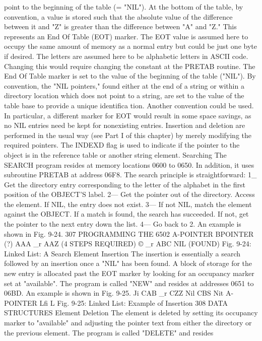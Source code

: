 \documentclass{book}
\begin{document}
{{{{{{{{{point to the beginning of the table (= "NIL"). At the bottom of the
table, by convention, a value is stored such that the absolute value
of the difference between it and "Z" is greater than the difference
between "A" and "Z." This represents an End Of Table (EOT)
marker. The EOT value is assumed here to occupy the same
amount of memory as a normal entry but could be just one byte if
desired.
The letters are assumed here to be alphabetic letters in ASCII
code. Changing this would require changing the constant at the
PRETAB routine.
The End Of Table marker is set to the value of the beginning of
the table ("NIL").
By convention, the "NIL pointers," found either at the end of a
string or within a directory location which does not point to a string,
are set to the value of the table base to provide a unique identifica
tion. Another convention could be used. In particular, a different
marker for EOT would result in some space savings, as no NIL
entries need be kept for nonexisting entries.
Insertion and deletion are performed in the usual way (see Part I
of this chapter) by merely modifying the required pointers. The
INDEXD flag is used to indicate if the pointer to the object is in
the reference table or another string element.
Searching
The SEARCH program resides at memory locations 0600 to
0650. In addition, it uses subroutine PRETAB at address 06F8.
The search principle is straightforward:
1_ Get the directory entry corresponding to the letter of the
alphabet in the first position of the OBJECT'S label.
2— Get the pointer out of the directory. Access the element. If NIL,
the entry does not exist.
3— If not NIL, match the element against the OBJECT. If a
match is found, the search has succeeded. If not, get the pointer to
the next entry down the list.
4— Go back to 2.
An example is shown in Fig. 9-24.
307
PROGRAMMING THE 6502
A-POINTER
BPOINTER
(?)
AAA _r AAZ
(4 STEPS REQUIRED)
©
_r ABC
NIL
(FOUND)
Fig. 9-24: Linked List: A Search
Element Insertion
The insertion is essentially a search followed by an insertion
once a "NIL" has been found. A block of storage for the new entry
is allocated past the EOT marker by looking for an occupancy
marker set at "available". The program is called "NEW" and
resides at addresses 0651 to 06BD. An example is shown in Fig.
9-25.
Ji CAB _r CZZ
Nil
CBS
Nit
A-POINTER Lfi
L
Fig. 9-25: Linked List: Example of Insertion
308
DATA STRUCTURES
Element Deletion
The element is deleted by setting its occupancy marker to "available"
and adjusting the pointer text from either the directory or the
previous element. The program is called "DELETE" and resides
}}}}}}}}}
\end{document}

